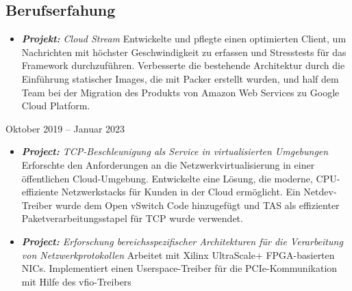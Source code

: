 \documentclass[../main.tex]{subfiles}
\begin{document}
  \begin{category}
    \section{Berufserfahung}
      \begin{itemize}
        \item \emph{\textbf{Projekt:} Cloud Stream}
        Entwickelte und pflegte einen optimierten Client, um Nachrichten mit 
        höchster Geschwindigkeit zu erfassen und Stresstests für das 
        Framework durchzuführen. Verbesserte die bestehende Architektur 
        durch die Einführung statischer Images, die mit Packer erstellt 
        wurden, und half dem Team bei der Migration des Produkts von
        Amazon Web Services zu Google Cloud Platform.
      \end{itemize}

     \strut\hfill Oktober 2019 -- Januar 2023\\[-9pt]
      \begin{itemize}
        \item \emph{\textbf{Project:} 
          TCP-Beschleunigung als Service in virtualisierten Umgebungen
        }
        Erforschte den Anforderungen an die Netzwerkvirtualisierung 
        in einer öffentlichen Cloud-Umgebung. Entwickelte eine Lösung, 
        die moderne, CPU-effiziente Netzwerkstacks für Kunden in der 
        Cloud ermöglicht. Ein Netdev-Treiber wurde dem Open vSwitch 
        Code hinzugefügt und TAS als effizienter Paketverarbeitungsstapel 
        für TCP wurde verwendet.


        \item \emph{\textbf{Project:} 
        Erforschung bereichsspezifischer Architekturen für die 
        Verarbeitung von Netzwerkprotokollen 
        } 
        Arbeitet mit Xilinx UltraScale+ FPGA-basierten NICs. 
        Implementiert einen Userspace-Treiber für die PCIe-Kommunikation 
        mit Hilfe des vfio-Treibers


\end{itemize}
\end{category}
\end{document}
